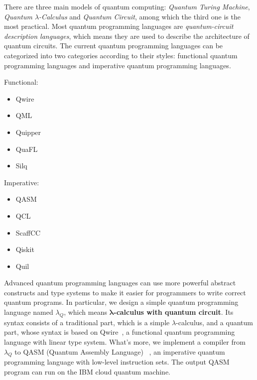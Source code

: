 There are three main models of quantum computing: \textit{Quantum Turing Machine}, \textit{Quantum $\lambda$-Calculus} and \textit{Quantum Circuit}, among which the third one is the most practical.
Most quantum programming languages are \textit{quantum-circuit description languages}, which means they are used to describe the architecture of quantum circuits.
The current quantum programming languages can be categorized into two categories according to their styles: functional quantum programming languages and imperative quantum programming languages.
\begin{multicols}{2}
  \begin{center}
    Functional:
  \end{center}
  \begin{itemize}
    \item Qwire
    \item QML
    \item Quipper
    \item QuaFL
    \item Silq
  \end{itemize}

  \columnbreak

  \begin{center}
    Imperative:
  \end{center}
  \begin{itemize}
    \item QASM
    \item QCL
    \item ScaffCC
    \item Qiskit
    \item Quil
  \end{itemize}
\end{multicols}

Advanced quantum programming languages can use more powerful abstract constructs and type systems to make it easier for programmers to write correct quantum programs.
In particular, we design a simple quantum programming language named $\lambda_Q$, which means \textbf{$\boldsymbol{\lambda}$-calculus with quantum circuit}.
Its syntax consists of a traditional part, which is a simple $\lambda$-calculus, and a quantum part, whose syntax is based on Qwire~\cite{qwire}, a functional quantum programming language with linear type system.
What's more, we implement a compiler from $\lambda_Q$ to QASM (Quantum Assembly Language) ~\cite{qasm}, an imperative quantum programming language with low-level instruction sets.
The output QASM program can run on the IBM cloud quantum machine.

